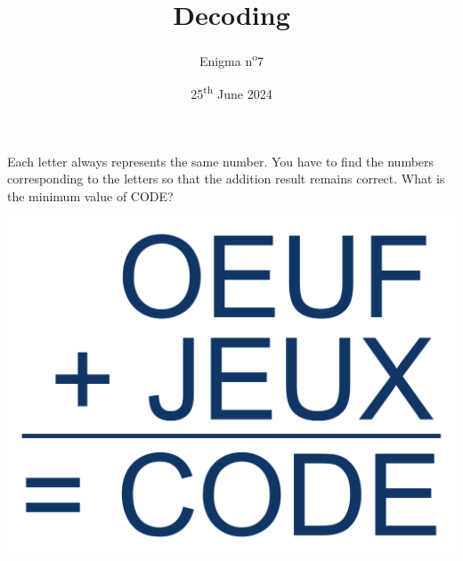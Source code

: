 \documentclass[a4paper, top=10mm]{article}
\title{\textbf{\huge{Decoding}}}
\author{Enigma n\textsuperscript{o}7}
\date{25\textsuperscript{th} June 2024}
\begin{document}
	\maketitle
	
	\Large
	Each letter always represents the same number.
	You have to find the numbers corresponding to the letters so that the addition result remains correct.
	What is the minimum value of CODE?
	
	\vspace{2cm}
	
	\begin{center}
		\includegraphics[width=\linewidth]{07addition.pdf}
	\end{center}
	
	
\end{document}
